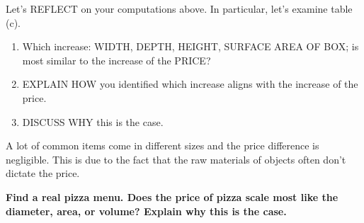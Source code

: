\documentclass[nooutcomes,noauthor,12pt,handout]{ximera}
\begin{document}




\begin{question}
  Let's REFLECT on your computations above. In particular, let's
  examine table (c).%
  \begin{enumerate}
    \item Which increase: WIDTH, DEPTH, HEIGHT, SURFACE AREA OF BOX;
      is most similar to the increase of the PRICE?
    \item EXPLAIN HOW you identified which increase aligns with the
      increase of the price.
    \item DISCUSS WHY this is the case.
  \end{enumerate}
\end{question}
\mynewpage


\begin{question}
  A lot of common items come in different sizes and the price
  difference is negligible. This is due to the fact that the raw
  materials of objects often don't dictate the price.

  \textbf{Find a real pizza menu. Does the price of pizza scale most like the
  diameter, area, or volume?  Explain why this is the case.}
 
\end{question}
\end{document}
